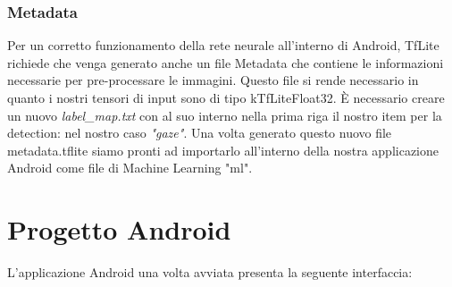 \documentclass[11pt]{article}
\begin{document}
\subsubsection{Metadata}
Per un corretto funzionamento della rete neurale all'interno di Android, TfLite richiede che venga generato anche un file Metadata che contiene le informazioni necessarie per pre-processare le immagini. Questo file si rende necessario in quanto i nostri tensori di input sono di tipo kTfLiteFloat32. È necessario creare un nuovo \textit{label\_map.txt} con al suo interno nella prima riga il nostro item per la detection: nel nostro caso \textit{"gaze"}.
\newline
Una volta generato questo nuovo file metadata.tflite siamo pronti ad importarlo all'interno della nostra applicazione Android come file di Machine Learning "ml".

\newpage
\section{Progetto Android}
L'applicazione Android una volta avviata presenta la seguente interfaccia:
\end{document}
